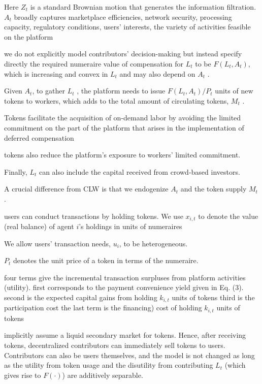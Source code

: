 {\begin{equation}
\end{equation} 

Here $Z_t$ is a standard Brownian motion that generates the information filtration. $A_t$ broadly captures marketplace efficiencies, network security, processing capacity, regulatory conditions, users' interests, the variety of activities feasible on the platform

we do not explicitly model contributors' decision-making but instead specify directly the required numeraire value of compensation for $L_t$ to be $F(L_t, A_t )$, which is increasing and convex in $L_t$ and may also depend on $A_t$ .

Given $A_t$, to gather $L_t$ , the platform needs to issue $F(L_t , A_t )/P_t$ units of new tokens to workers, which adds to the total amount of circulating tokens, $M_t$ .

Tokens facilitate the acquisition of on-demand labor by avoiding the limited commitment on the part of the platform that arises in the implementation of deferred compensation

tokens also reduce the platform's exposure to workers' limited commitment.

Finally, $L_t$ can also include the capital received from crowd-based investors.

A crucial difference from CLW is that we endogenize $A_t$ and the token supply $M_t$ .

users can conduct transactions by holding tokens. We use $x_{i,t}$ to denote the value (real balance) of agent $i$'s holdings in units of numeraires

We allow users' transaction needs, $u_i$, to be heterogeneous.

$P_t$ denotes the unit price of a token in terms of the numeraire.

four terms give the incremental transaction surpluses from platform activities (utility). first corresponds to the payment convenience yield given in Eq. (3). second is the expected capital gains from holding $k_{i,t}$ units of tokens third is the participation cost the last term is the financing) cost of holding $k_{i,t}$ units of tokens

implicitly assume a liquid secondary market for tokens. Hence, after receiving tokens, decentralized contributors can immediately sell tokens to users. Contributors can also be users themselves, and the model is not changed as long as the utility from token usage and the disutility from contributing $L_t$ (which gives rise to $F (\cdot{} )$) are additively separable.

}
